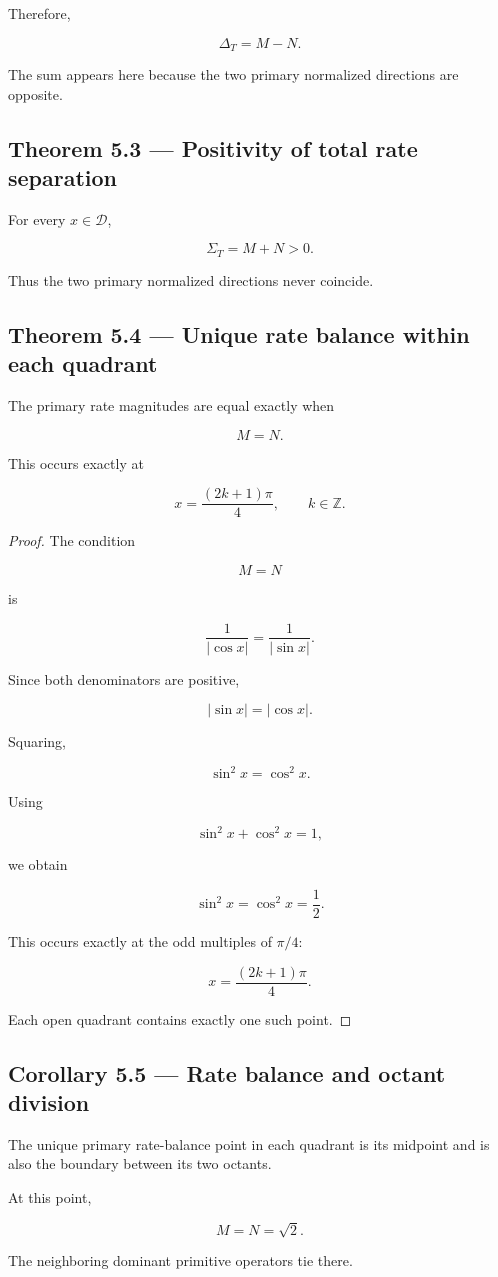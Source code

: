 \documentclass[11pt,oneside,openany]{book}
\newcommand{\PCsubsection}[1]{%
  \subsection*{#1}%
}
\begin{document}
Therefore,

\[
\boxed{ \Delta_T=M-N }.
\]

The sum appears here because the two primary normalized directions are opposite.

\PCsubsection{Theorem 5.3 --- Positivity of total rate separation}

For every \(x\in\mathcal D\),

\[
\boxed{ \Sigma_T=M+N>0 }.
\]

Thus the two primary normalized directions never coincide.

\PCsubsection{Theorem 5.4 --- Unique rate balance within each quadrant}

The primary rate magnitudes are equal exactly when

\[
M=N.
\]

This occurs exactly at

\[
\boxed{ x=\frac{(2k+1)\pi}{4}, \qquad k\in\mathbb Z }.
\]

\begin{proof}
The condition

\[
M=N
\]

is

\[
\frac1{|\cos x|} = \frac1{|\sin x|}.
\]

Since both denominators are positive,

\[
|\sin x|=|\cos x|.
\]

Squaring,

\[
\sin^2x=\cos^2x.
\]

Using

\[
\sin^2x+\cos^2x=1,
\]

we obtain

\[
\sin^2x=\cos^2x=\frac12.
\]

This occurs exactly at the odd multiples of \(\pi/4\):

\[
x=\frac{(2k+1)\pi}{4}.
\]

Each open quadrant contains exactly one such point.

\end{proof}

\PCsubsection{Corollary 5.5 --- Rate balance and octant division}

The unique primary rate-balance point in each quadrant is its midpoint and is also the boundary between its two octants.

At this point,

\[
M=N=\sqrt2.
\]

The neighboring dominant primitive operators tie there.
\end{document}
